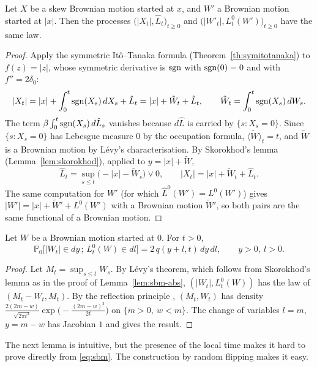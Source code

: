 \begin{lemma}\label{lem:sbm-abs}
	Let $X$ be a skew Brownian motion started at $x$, and $W'$ a Brownian motion
	started at $|x|$. Then the processes $\bigl(|X_t|,\hat{L}_t\bigr)_{t\geqslant0}$
	and $\bigl(|W'_t|,L^0_t(W')\bigr)_{t\geqslant0}$ have the same law.
\end{lemma}
\begin{proof}
	Apply the symmetric Itô--Tanaka formula (Theorem~\ref{th:symitotanaka}) to
	$f(z) = |z|$, whose symmetric derivative is $\operatorname{sgn}$ with $\operatorname{sgn}(0) = 0$ and
	with $f'' = 2\delta_0$:
	\[
		|X_t| = |x| + \int_0^t\operatorname{sgn}(X_s)\,dX_s + \hat{L}_t
		= |x| + \tilde{W}_t + \hat{L}_t,
		\qquad \tilde{W}_t = \int_0^t\operatorname{sgn}(X_s)\,dW_s .
	\]
	The term $\beta\int_0^t\operatorname{sgn}(X_s)\,d\hat{L}_s$ vanishes because $d\hat{L}$
	is carried by $\{s : X_s = 0\}$. Since $\{s : X_s = 0\}$ has Lebesgue measure
	$0$ by the occupation formula, $\langle\tilde{W}\rangle_t = t$, and
	$\tilde{W}$ is a Brownian motion by Lévy's characterisation. By Skorokhod's
	lemma (Lemma~\ref{lem:skorokhod}), applied to $y = |x| + \tilde{W}$,
	\[
		\hat{L}_t = \sup_{s\leqslant t}\bigl(-|x| - \tilde{W}_s\bigr)\vee0,
		\qquad |X_t| = |x| + \tilde{W}_t + \hat{L}_t .
	\]
	The same computation for $W'$ (for which $\hat{L}^0(W') = L^0(W')$) gives
	$|W'| = |x| + \tilde{W}' + L^0(W')$ with a Brownian motion $\tilde{W}'$, so
	both pairs are the same functional of a Brownian motion.
\end{proof}

\begin{lemma}\label{lem:bm-joint}
	Let $W$ be a Brownian motion started at $0$. For $t>0$,
	\[
		\mathbb{P}_0\bigl[|W_t|\in dy\,;\,L^0_t(W)\in dl\bigr] = 2\,q(y+l,t)\,dy\,dl,
		\qquad y>0,\ l>0 .
	\]
\end{lemma}
\begin{proof}
	Let $M_t = \sup_{s\leqslant t}W_s$. By Lévy's theorem, which follows from
	Skorokhod's lemma as in the proof of Lemma~\ref{lem:sbm-abs},
	$(|W_t|,L^0_t(W))$ has the law of $(M_t - W_t,M_t)$. By the reflection
	principle \citep[Section~2.8]{KaratzasShreve1991}, $(M_t,W_t)$ has density
	$\frac{2(2m-w)}{\sqrt{2\pi t^3}}\exp\bigl(-\frac{(2m-w)^2}{2t}\bigr)$ on
	$\{m>0,\ w<m\}$. The change of variables $l = m$, $y = m-w$ has Jacobian $1$
	and gives the result.
\end{proof}

The next lemma is intuitive, but the presence of the local time makes it hard
to prove directly from \eqref{eq:sbm}. The construction by random flipping
makes it easy.

